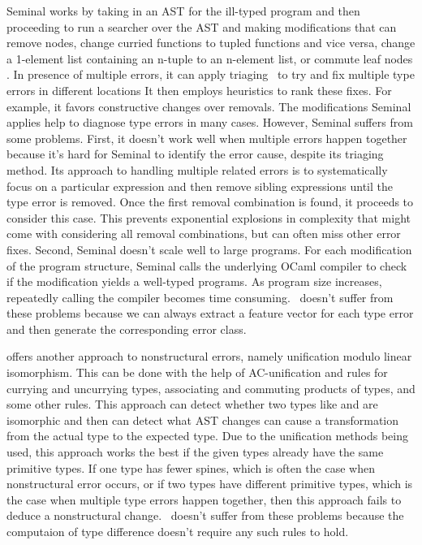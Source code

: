 \documentclass[12pt]{report}	%
\begin{document}
Seminal works by taking in an AST for the ill-typed program
and then proceeding to run a searcher over the AST and
making modifications that can remove nodes, change curried functions
to tupled functions and vice versa, change a 1-element list containing an n-tuple to an n-element list, or commute leaf nodes \cite{Lerner07:STM}.
In presence of multiple errors, it can apply triaging~\cite{Lerner07:STM}
to try and fix multiple type errors in different locations
It then employs heuristics to rank
these fixes. For example, it favors constructive changes over removals.
The modifications Seminal applies help to diagnose type
errors in many cases. However, Seminal suffers from
some problems. First, it doesn't work well when multiple errors
happen together because it's hard for Seminal to identify the error
cause, despite its triaging method.
%
Its approach to handling
multiple related errors is to systematically focus on a particular
expression and then remove sibling expressions until the type
error is removed. Once the first removal combination is found, it
proceeds to consider this case.
This prevents exponential explosions in complexity
that might come with considering all removal combinations,
but can often miss other error fixes.
%
Second, Seminal doesn't scale well to large programs.
For each modification of the program structure, Seminal calls
the underlying OCaml compiler to check if the modification yields
a well-typed programs. As program size increases, repeatedly calling
the compiler becomes time consuming.
%
\newCompiler\ doesn't suffer from these problems because
we can always extract a feature vector for each type error and
then generate the corresponding error class. 

\cite{McAdam02:RTE} offers another approach to nonstructural errors, namely
unification modulo linear isomorphism.
This can be done with the help of AC-unification and rules for
currying and uncurrying types, associating and
commuting products of types, and some other rules.
This approach can detect whether two types like
 and  are isomorphic and then can detect what AST changes
can cause a transformation from the actual type to the expected type.
Due to the unification methods being used, this
approach works the best if the given types already have the same
primitive types. If one type has fewer spines, which is often the
case when nonstructural error occurs, or if two types have different
primitive types, which is the case when multiple type errors happen
together, then this approach fails to deduce a nonstructural change.
%
\newCompiler\ doesn't suffer from these problems because the computaion
of type difference doesn't require any such rules to hold.
\end{document}
